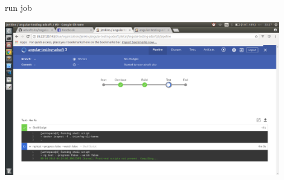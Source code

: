 \documentclass{beamer}
\begin{document}
\begin{frame}\frametitle{} 

\begin{block}{run job}
\end{block}


\begin{center}
\includegraphics[width=0.9\textwidth]{jenkins-testing.png}
\end{center}

\end{frame}
\end{document}
